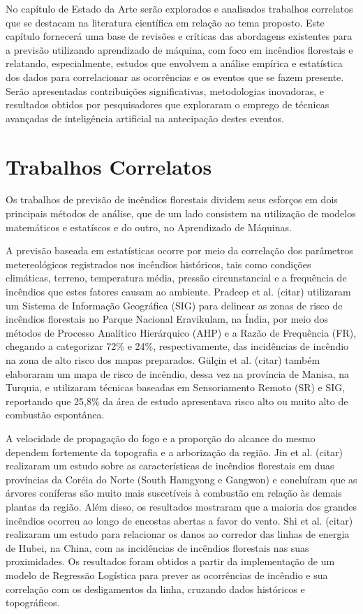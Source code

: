 
No capítulo de Estado da Arte serão explorados e analisados trabalhos correlatos que se destacam na literatura científica em relação ao tema proposto. Este capítulo fornecerá uma base de revisões e críticas das abordagens existentes para a previsão utilizando aprendizado de máquina, com foco em incêndios florestais e relatando, especialmente, estudos que envolvem a análise empírica e estatística dos dados para correlacionar as ocorrências e os eventos que se fazem presente. Serão apresentadas contribuições significativas, metodologias inovadoras, e resultados obtidos por pesquisadores que exploraram o emprego de técnicas avançadas de inteligência artificial na antecipação destes eventos.

\section{Trabalhos Correlatos}

Os trabalhos de previsão de incêndios florestais dividem seus esforços em dois principais métodos de análise, que de um lado consistem na utilização de modelos matemáticos e estatíscos e do outro, no Aprendizado de Máquinas.

A previsão baseada em estatísticas ocorre por meio da correlação dos parâmetros metereológicos registrados nos incêndios históricos, tais como condições climáticas, terreno, temperatura média, pressão circunstancial e a frequência de incêndios que estes fatores causam ao ambiente. Pradeep et al. (citar) utilizaram um Sistema de Informação Geográfica (SIG) para delinear as zonas de risco de incêndios florestais no Parque Nacional Eravikulam, na Índia, por meio dos métodos de Processo Analítico Hierárquico (AHP) e a Razão de Frequência (FR), chegando a categorizar 72\% e 24\%, respectivamente, das incidências de incêndio na zona de alto risco dos mapas preparados. Gülçin et al. (citar) também elaboraram um mapa de risco de incêndio, dessa vez na província de Manisa, na Turquia, e utilizaram técnicas baseadas em Sensoriamento Remoto (SR) e SIG, reportando que 25,8\% da área de estudo apresentava risco alto ou muito alto de combustão espontânea.

A velocidade de propagação do fogo e a proporção do alcance do mesmo dependem fortemente da topografia e a arborização da região. Jin et al. (citar) realizaram um estudo sobre as características de incêndios florestais em duas províncias da Coréia do Norte (South Hamgyong e Gangwon) e concluíram que as árvores coníferas são muito mais suscetíveis à combustão em relação às demais plantas da região. Além disso, os resultados mostraram que a maioria dos grandes incêndios ocorreu ao longo de encostas abertas a favor do vento. Shi et al. (citar) realizaram um estudo para relacionar os danos ao corredor das linhas de energia de Hubei, na China, com as incidências de incêndios florestais nas suas proximidades. Os resultados foram obtidos a partir da implementação de um modelo de Regressão Logística para prever as ocorrências de incêndio e sua correlação com os desligamentos da linha, cruzando dados históricos e topográficos.

